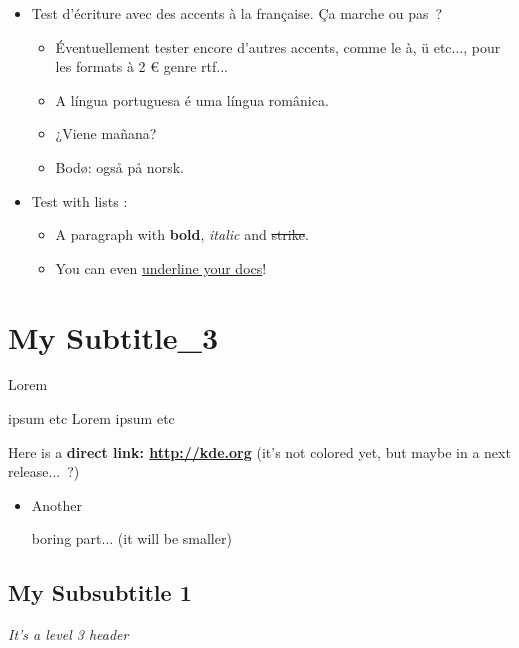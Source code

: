 \documentclass[openany]{book} %
\begin{document}
\begin{itemize}
\item Test d'écriture avec des accents à la française. Ça marche ou pas~?
 \begin{itemize}
 \item Éventuellement tester encore d'autres accents, comme le à, ü etc..., pour les formats à 2 € genre rtf...
 \item A língua portuguesa é uma língua românica.
 \item ¿Viene mañana?
 \item Bodø: også på norsk.
 \end{itemize}
\end{itemize}

\begin{itemize}
\item Test with lists :
 \begin{itemize}
 \item A paragraph with \textbf{bold}, \textit{italic} and \sout{strike}.
 \item You can even \underline{underline your docs}!
 \end{itemize}
\end{itemize}

\hypertarget{toc20}{}
\pagebreak[\PAGExBREAKxPOLICY]
\chapter{My Subtitle\_3}

Lorem \begin{Large} ipsum etc
Lorem ipsum etc \end{Large}

Here is a \textbf{direct link: \href{http://kde.org}{http://kde.org}}
(it's not colored yet, but maybe in a next release...~?)

\begin{itemize}
\item Another \begin{small} boring part... (it will be smaller) \end{small}
\end{itemize}

\hypertarget{toc21}{}
\pagebreak[\PAGExSUBxBREAKxPOLICY]
\section{My Subsubtitle 1}

\textit{It's a level 3 header} 
\end{document}
